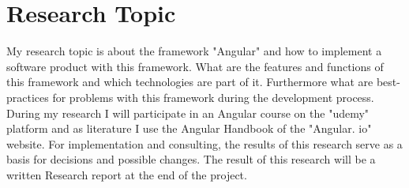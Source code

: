 \section{Research Topic}
\label{sec:research}
My research topic is about the framework "Angular" and how to implement a software product with this framework. What are the features and functions of this framework and which technologies are part of it. Furthermore what are best-practices for problems with this framework during the development process. During my research I will participate in an Angular course on the "udemy" platform and as literature I use the Angular Handbook of the "Angular. io" website. For implementation and consulting, the results of this research serve as a basis for decisions and possible changes. The result of this research will be a written Research report at the end of the project.